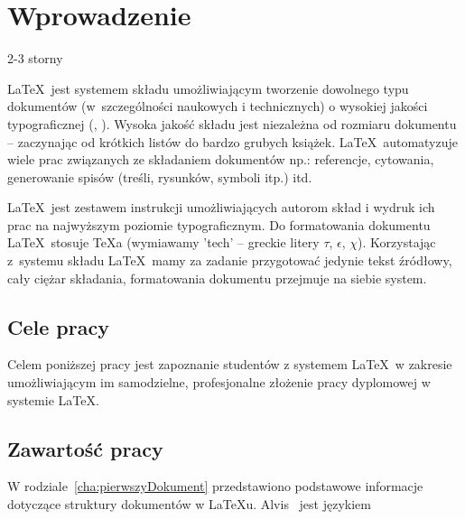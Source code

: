 \chapter{Wprowadzenie}
2-3 storny
\label{cha:wprowadzenie}

\LaTeX~jest systemem składu umożliwiającym tworzenie dowolnego typu dokumentów (w~szczególności naukowych i technicznych) o wysokiej jakości typograficznej (\cite{Dil00}, \cite{Lam92}). Wysoka jakość składu jest niezależna od rozmiaru dokumentu -- zaczynając od krótkich listów do bardzo grubych książek. \LaTeX~automatyzuje wiele prac związanych ze składaniem dokumentów np.: referencje, cytowania, generowanie spisów (treśli, rysunków, symboli itp.) itd.

\LaTeX~jest zestawem instrukcji umożliwiających autorom skład i wydruk ich prac na najwyższym poziomie typograficznym. Do formatowania dokumentu \LaTeX~stosuje \TeX a (wymiawamy 'tech' -- greckie litery $\tau$, $\epsilon$, $\chi$). Korzystając z~systemu składu \LaTeX~mamy za zadanie przygotować jedynie tekst źródłowy, cały ciężar składania, formatowania dokumentu przejmuje na siebie system.


\section{Cele pracy}
\label{sec:celePracy}

Celem poniższej pracy jest zapoznanie studentów z systemem \LaTeX~w zakresie umożliwiającym im samodzielne, profesjonalne złożenie pracy dyplomowej w systemie \LaTeX.



\section{Zawartość pracy}
\label{sec:zawartoscPracy}

W rodziale~\ref{cha:pierwszyDokument} przedstawiono podstawowe informacje dotyczące struktury dokumentów w \LaTeX u. Alvis~\cite{Alvis2011} jest językiem


















